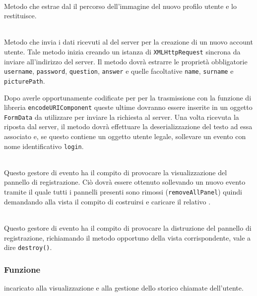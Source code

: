 \begin{description}
	\item{}\\
	Metodo che estrae dal  il percorso dell'immagine del nuovo profilo utente e lo restituisce.
	
	\item{}\\
	Metodo che invia i dati ricevuti al  del server per la creazione di un nuovo account utente. Tale metodo inizia creando un istanza di \texttt{XMLHttpRequest} sincrona da inviare all'indirizzo del server. Il metodo dovrà estrarre le proprietà obbligatorie \verb'username', \verb'password', \verb'question', \verb'answer' e quelle facoltative \verb'name', \verb'surname' e \verb'picturePath'.
	
	Dopo averle opportunamente codificate per per la trasmissione con la funzione di libreria \verb'encodeURIComponent' queste ultime dovranno essere inserite in un oggetto \verb'FormData' da utilizzare per inviare la richiesta al server. Una volta ricevuta la riposta dal server, il metodo dovrà effettuare la deserializzazione del testo ad essa associato e, se questo contiene un oggetto utente legale, sollevare un evento con nome identificativo \verb'login'.
	
	\item{}\\
	Questo gestore di evento ha il compito di provocare la visualizzazione del pannello di registrazione. Ciò dovrà essere ottenuto sollevando un nuovo evento tramite il quale tutti i pannelli presenti sono rimossi (\verb'removeAllPanel') quindi demandando alla vista il compito di costruirsi e caricare il relativo .
	
	\item{}\\
	Questo gestore di evento ha il compito di provocare la distruzione del pannello di registrazione, richiamando il metodo opportuno della vista corrispondente, vale a dire \verb+destroy()+.

\end{description}


\subsubsection*{Funzione}
 incaricato alla visualizzazione e alla gestione dello storico chiamate dell'utente.

